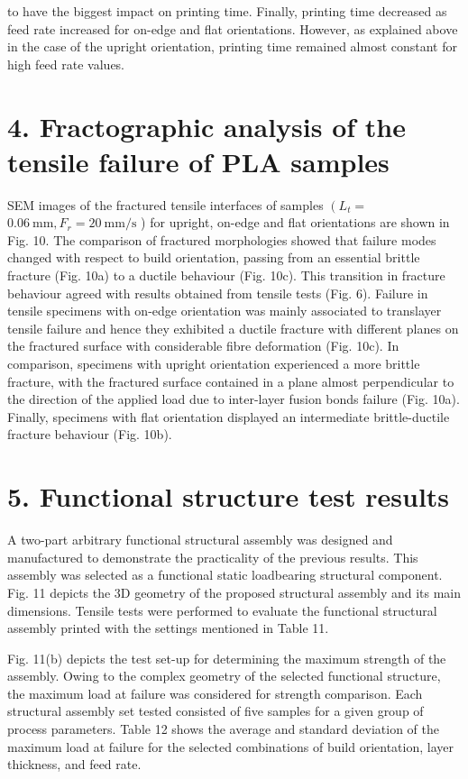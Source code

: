 \documentclass[10pt]{article}
\begin{document}
to have the biggest impact on printing time. Finally, printing time decreased as feed rate increased for on-edge and flat orientations. However, as explained above in the case of the upright orientation, printing time remained almost constant for high feed rate values.

\section*{4. Fractographic analysis of the tensile failure of PLA samples}
SEM images of the fractured tensile interfaces of samples $\left(L_{t}=\right.$ $0.06 \mathrm{~mm}, F_{r}=20 \mathrm{~mm} / \mathrm{s}$ ) for upright, on-edge and flat orientations are shown in Fig. 10. The comparison of fractured morphologies showed that failure modes changed with respect to build orientation, passing from an essential brittle fracture (Fig. 10a) to a ductile behaviour (Fig. 10c). This transition in fracture behaviour agreed with results obtained from tensile tests (Fig. 6). Failure in tensile specimens with on-edge orientation was mainly associated to translayer tensile failure and hence they exhibited a ductile fracture with different planes on the fractured surface with considerable fibre deformation (Fig. 10c). In comparison, specimens with upright orientation experienced a more brittle fracture, with the fractured surface contained in a plane almost perpendicular to the direction of the applied load due to inter-layer fusion bonds failure (Fig. 10a). Finally, specimens with flat orientation displayed an intermediate brittle-ductile fracture behaviour (Fig. 10b).

\section*{5. Functional structure test results}
A two-part arbitrary functional structural assembly was designed and manufactured to demonstrate the practicality of the previous results. This assembly was selected as a functional static loadbearing structural component. Fig. 11 depicts the 3D geometry of the proposed structural assembly and its main dimensions. Tensile tests were performed to evaluate the functional structural assembly printed with the settings mentioned in Table 11.

Fig. 11(b) depicts the test set-up for determining the maximum strength of the assembly. Owing to the complex geometry of the selected functional structure, the maximum load at failure was considered for strength comparison. Each structural assembly set tested consisted of five samples for a given group of process parameters. Table 12 shows the average and standard deviation of the maximum load at failure for the selected combinations of build orientation, layer thickness, and feed rate.
\end{document}
